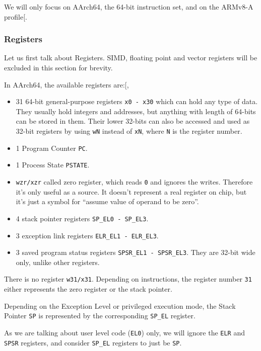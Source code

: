 \documentclass[a4paper, nobind]{templates/ociamthesis}
\providecommand{\tightlist}{%
  \setlength{\itemsep}{0pt}\setlength{\parskip}{0pt}}
\begin{document}
We will only focus on AArch64, the 64-bit instruction set, and on the ARMv8-A profile{[}\citeproc{ref-arm-arch-manual}{6}{]}.

\subsubsection{Registers}\label{registers}

Let us first talk about Registers.
SIMD, floating point and vector registers will be excluded in this section for brevity.

In AArch64, the available registers are:{[}, \citeproc{ref-arm-isa}{5}{]}

\begin{itemize}
\tightlist
\item
  31 64-bit general-purpose registers \texttt{x0\ -\ x30} which can hold any type of data.
  They usually hold integers and addresses, but anything with length of 64-bits
  can be stored in them. Their lower 32-bits can also be accessed and used as
  32-bit registers by using \texttt{wN} instead of \texttt{xN}, where \texttt{N} is the register number.
\item
  1 Program Counter \texttt{PC}.
\item
  1 Process State \texttt{PSTATE}.
\item
  \texttt{wzr/xzr} called zero register,
  which reads \texttt{0} and ignores the writes. Therefore it's only useful as a source.
  It doesn't represent a real register on chip,
  but it's just a symbol for ``assume value of operand to be zero''.
\item
  4 stack pointer registers \texttt{SP\_EL0\ -\ SP\_EL3}.
\item
  3 exception link registers \texttt{ELR\_EL1\ -\ ELR\_EL3}.
\item
  3 saved program status registers \texttt{SPSR\_EL1\ -\ SPSR\_EL3}. They are 32-bit wide only,
  unlike other registers.
\end{itemize}

There is no register \texttt{w31/x31}. Depending on instructions, the register number \texttt{31}
either represents the zero register or the stack pointer.

Depending on the Exception Level or privileged execution mode,
the Stack Pointer \texttt{SP} is represented by the corresponding \texttt{SP\_EL} register.

As we are talking about user level code (\texttt{EL0}) only, we will ignore the \texttt{ELR} and \texttt{SPSR}
registers, and consider \texttt{SP\_EL} registers to just be \texttt{SP}.
\end{document}
